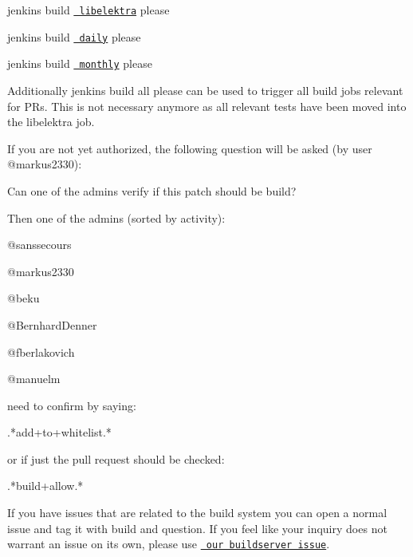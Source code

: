 \begin{DoxyItemize}
\item jenkins build \href{https://build.libelektra.org/job/libelektra/}{\texttt{ libelektra}} please
\item jenkins build \href{https://build.libelektra.org/job/libelektra-daily/}{\texttt{ daily}} please
\item jenkins build \href{https://build.libelektra.org/job/libelektra-monthly/}{\texttt{ monthly}} please
\end{DoxyItemize}

Additionally {\ttfamily jenkins build all please} can be used to trigger all build jobs relevant for PR\textquotesingle{}s. This is not necessary anymore as all relevant tests have been moved into the libelektra job.

If you are not yet authorized, the following question will be asked (by user @markus2330)\+: \begin{DoxyVerb}Can one of the admins verify if this patch should be build?
\end{DoxyVerb}


Then one of the admins (sorted by activity)\+:


\begin{DoxyItemize}
\item @sanssecours
\item @markus2330
\item @beku
\item @\+Bernhard\+Denner
\item @fberlakovich
\item @manuelm
\end{DoxyItemize}

need to confirm by saying\+: \begin{DoxyVerb}.*add\W+to\W+whitelist.*
\end{DoxyVerb}


or if just the pull request should be checked\+: \begin{DoxyVerb}.*build\W+allow.*
\end{DoxyVerb}


If you have issues that are related to the build system you can open a normal issue and tag it with {\ttfamily build} and {\ttfamily question}. If you feel like your inquiry does not warrant an issue on its own, please use \href{https://issues.libelektra.org/160}{\texttt{ our buildserver issue}}. 